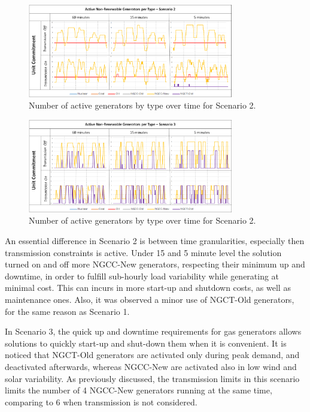 \documentclass[12pt,LUDisStyle,twosided]{book}
\begin{document}
  \begin{figure}[H] 
  \centering
  
	  \includegraphics[width=0.8\textwidth,keepaspectratio]{activeGeneratorsS2.png}
  
  \caption{Number of active generators by type over time for Scenario 2.}
  \label{fig:activeGeneratorsS2}
  
\end{figure}


\begin{figure}[H] 
  \centering
  
	  \includegraphics[width=0.8\textwidth,keepaspectratio]{activeGeneratorsS3.png}
  
  \caption{Number of active generators by type over time for Scenario 2.}
  \label{fig:activeGeneratorsS3}
  
\end{figure}

An essential difference in Scenario 2 is between time granularities, especially then transmission constraints is active. Under 15 and 5 minute level the solution turned on and off more NGCC-New generators, respecting their minimum up and downtime, in order to fulfill sub-hourly load variability while generating at minimal cost. This can incurs in more start-up and shutdown costs, as well as maintenance ones. Also, it was observed a minor use of NGCT-Old generators, for the same reason as Scenario 1.

In Scenario 3, the quick up and downtime requirements for gas generators allows solutions to quickly start-up and shut-down them when it is convenient. It is noticed that NGCT-Old generators are activated only during peak demand, and deactivated afterwards, whereas NGCC-New are activated also in low wind and solar variability. As previously discussed, the transmission limits in this scenario limits the number of 4 NGCC-New generators running at the same time, comparing to 6 when transmission is not considered.
\end{document}
